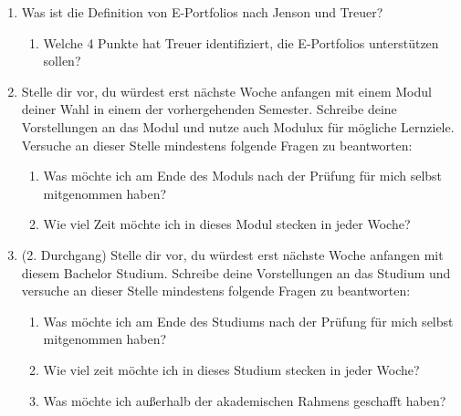 \documentclass[a4paper,oneside]{scrarticle}
\begin{document}
	\begin{enumerate}
		\item Was ist die Definition von E-Portfolios nach Jenson und Treuer?
		\begin{enumerate}
			\item Welche 4 Punkte hat Treuer identifiziert, die E-Portfolios unterstützen sollen?
		\end{enumerate}
		\item Stelle dir vor, du würdest erst nächste Woche anfangen mit einem Modul deiner Wahl in einem der vorhergehenden Semester. Schreibe deine Vorstellungen an das Modul und nutze auch Modulux für mögliche Lernziele. Versuche an dieser Stelle mindestens folgende Fragen zu beantworten:
		\begin{enumerate}
			\item Was möchte ich am Ende des Moduls nach der Prüfung für mich selbst mitgenommen haben?
			\item Wie viel Zeit möchte ich in dieses Modul stecken in jeder Woche?
		\end{enumerate}
		\item (2. Durchgang) Stelle dir vor, du würdest erst nächste Woche anfangen mit diesem Bachelor Studium. Schreibe deine Vorstellungen an das Studium und versuche an dieser Stelle mindestens folgende Fragen zu beantworten:
		\begin{enumerate}
			\item Was möchte ich am Ende des Studiums nach der Prüfung für mich selbst mitgenommen haben?
			\item Wie viel zeit möchte ich in dieses Studium stecken in jeder Woche?
			\item Was möchte ich außerhalb der akademischen Rahmens geschafft haben?
		\end{enumerate}

	\end{enumerate}
\end{document}
